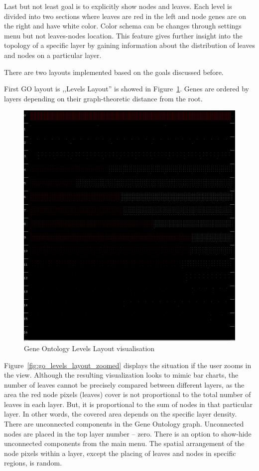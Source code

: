 Last but not least goal is to explicitly show nodes and leaves. Each level is divided into two sections where leaves are red in the left and node genes are on the right and have white color. Color schema can be changes through settings menu but not leaves-nodes location. This feature gives further insight into the topology of a specific layer by gaining information about the distribution of leaves and nodes on a particular layer.

There are two layouts implemented based on the goals discussed before.

First GO layout is ,,Levels Layout'' is showed in Figure~\ref{fig:go_levels_layout}. Genes are ordered by layers depending on their graph-theoretic distance from the root.

\begin{figure}[h!]
\centering
\includegraphics[scale=0.3]{pictures/go_levels_layout.png}
\caption{Gene Ontology Levels Layout visualisation}
\label{fig:go_levels_layout}
\end{figure}

Figure~\ref{fig:go_levels_layout_zoomed} displays the situation if the user zooms in the view. Although the resulting visualization looks to mimic bar charts, the number of leaves cannot be precisely compared between different layers, as the area the red node pixels (leaves) cover is not proportional to the total number of leaves in each layer. But, it is proportional to the sum of nodes in that particular layer. In other words, the covered area depends on the specific layer density. There are unconnected components in the Gene Ontology graph. Unconnected nodes are placed in the top layer number -- zero. There is an option to show-hide unconnected components from the main menu. The spatial arrangement of the node pixels within a layer, except the placing of leaves and nodes in specific regions, is random.

